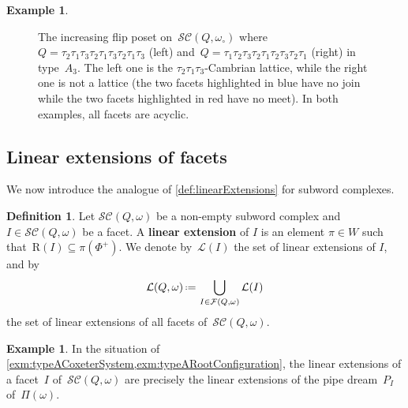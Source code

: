 \documentclass[reqno]{amsart}
\theoremstyle{definition}
\newtheorem{definition}[theorem]{Definition}
\newtheorem{example}[theorem]{Example}
\newcommand{\eqdef}{\mbox{\,\raisebox{0.2ex}{\scriptsize\ensuremath{\mathrm:}}\ensuremath{=}\,}} %
\newcommand{\red}[1]{{\color{red} #1}} %
\newcommand{\defn}[1]{\textbf{\textsf{\color{PineGreen} #1}}} %
\newcommand{\pipeDreams}{\Pi} %
\newcommand{\linearExtensions}{\mathcal{L}} %
\newcommand{\wo}{\omega_\circ} %
\newcommand{\subwordComplex}{\mathcal{SC}} %
\newcommand{\Roots}{\mathrm{R}} %
\newcommand{\subwordFacets}{\mathcal{F}} %
\begin{document}
\begin{example}
\begin{figure}[t]
{
	}
	\caption{The increasing flip poset on~$\subwordComplex(Q, \wo)$ where~$Q = \tau_2 \tau_1 \tau_3 \tau_2 \tau_1 \tau_3 \tau_2 \tau_1 \tau_3$ (left) and~$Q = \tau_1 \tau_2 \tau_3 \tau_2 \tau_1 \tau_2 \tau_3 \tau_2 \tau_1$ (right) in type~$A_3$. The left one is the $\tau_2 \tau_1 \tau_3$-Cambrian lattice, while the right one is not a lattice (the two facets highlighted in blue have no join while the two facets highlighted in red have no meet). In both examples, all facets are acyclic.}
	\label{fig:increasingFlipPosets}
\end{figure}
\end{example}


\subsection{Linear extensions of facets}
\label{subsec:linearExtensionsFacets}

We now introduce the analogue of \cref{def:linearExtensions} for subword complexes.

\begin{definition}
\label{def:linearExtensionsSubwordComplexes}
Let $\subwordComplex(Q,\omega)$ be a non-empty subword complex and $I\in \subwordComplex(Q,\omega)$ be a facet.
A \defn{linear extension} of $I$ is an element $\pi \in W$ such that~$\Roots(I) \subseteq \pi(\Phi^+)$.
We denote by~$\linearExtensions(I)$ the set of linear extensions of $I$, and by
\[
\linearExtensions(Q,\omega) \eqdef \bigcup_{I\in\subwordFacets(Q,\omega)} \linearExtensions(I)
\]
the set of linear extensions of all facets of~$\subwordComplex(Q,\omega)$.
\end{definition}

\begin{example}
In the situation of \cref{exm:typeACoxeterSystem,exm:typeARootConfiguration}, the linear extensions of a facet~$I$ of~$\subwordComplex(Q, \omega)$ are precisely the linear extensions of the pipe dream~$P_I$ of~$\pipeDreams(\omega)$.
\end{example}
\end{document}
